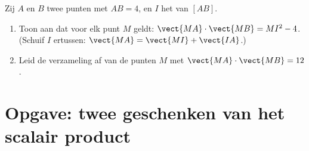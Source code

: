 \begin{exercise}[$\star\star\star$]\label{exo:g11:scal:11}
Zij $A$ en $B$ twee punten met $AB = 4$, en $I$ het  van $[AB]$.
\begin{enumerate}
  \item Toon aan dat voor elk punt $M$ geldt:
        $\vect{MA}\cdot\vect{MB} = MI^2 - 4$. (Schuif $I$ ertussen:
        $\vect{MA} = \vect{MI} + \vect{IA}$.)
  \item Leid de verzameling af van de punten $M$ met
        $\vect{MA}\cdot\vect{MB} = 12$.
\end{enumerate}
\end{exercise}

\section{Opgave: twee geschenken van het scalair product}

